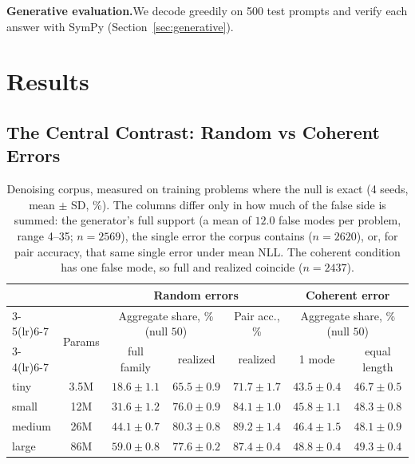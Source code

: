 \documentclass{article}
\begin{document}
\textbf{Generative evaluation.}\quad We decode greedily on 500 test prompts and verify each answer with SymPy (Section~\ref{sec:generative}).

\section{Results}

\subsection{The Central Contrast: Random vs Coherent Errors}
\label{sec:central}

\begin{table}[t]
\centering
\small
\begin{tabular}{lcccccc}
\toprule
 & & \multicolumn{3}{c}{Random errors} & \multicolumn{2}{c}{Coherent error} \\
\cmidrule(lr){3-5}\cmidrule(lr){6-7}
\multirow{2}{*}{Size} & \multirow{2}{*}{Params} & \multicolumn{2}{c}{Aggregate share, \% (null $50$)} & Pair acc., \% & \multicolumn{2}{c}{Aggregate share, \% (null $50$)} \\
\cmidrule(lr){3-4}\cmidrule(lr){6-7}
 & & full family & realized & realized & 1 mode & equal length \\
\midrule
tiny   & 3.5M & $18.6 \pm 1.1$ & $65.5 \pm 0.9$ & $71.7 \pm 1.7$ & $43.5 \pm 0.4$ & $46.7 \pm 0.5$ \\
small  & 12M  & $31.6 \pm 1.2$ & $76.0 \pm 0.9$ & $84.1 \pm 1.0$ & $45.8 \pm 1.1$ & $48.3 \pm 0.8$ \\
medium & 26M  & $44.1 \pm 0.7$ & $80.3 \pm 0.8$ & $89.2 \pm 1.4$ & $46.4 \pm 1.5$ & $48.1 \pm 0.9$ \\
large  & 86M  & $\mathbf{59.0 \pm 0.8}$ & $77.6 \pm 0.2$ & $87.4 \pm 0.4$ & $48.8 \pm 0.4$ & $49.3 \pm 0.4$ \\
\bottomrule
\end{tabular}
\caption{Denoising corpus, measured on training problems where the null is exact (4 seeds, mean $\pm$ SD, \%). The columns differ only in how much of the false side is summed: the generator's full support (a mean of $12.0$ false modes per problem, range 4--35; $n{=}2569$), the single error the corpus contains ($n{=}2620$), or, for pair accuracy, that same single error under mean NLL. The coherent condition has one false mode, so full and realized coincide ($n{=}2437$).}
\label{tab:central}
\end{table}
\end{document}

